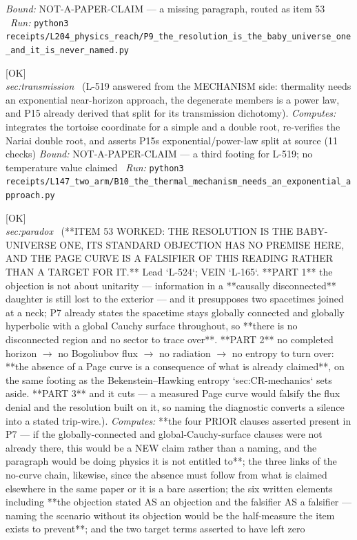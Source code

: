 \begin{description}
 \emph{Bound:} NOT-A-PAPER-CLAIM --- a missing paragraph, routed as item 53
\ \emph{Run:} \texttt{python3 receipts/L204\_physics\_reach/P9\_the\_resolution\_is\_the\_baby\_universe\_one\_and\_it\_is\_never\_named.py}
\item[\label{rcpt:B10_the_thermal_mechanism_needs_an_exponential_approach}\texttt{B10\_the\_thermal\_mechanism\_needs\_an\_exponential\_approach}]\hfill\textsf{[OK]}\\
\textit{sec:transmission} \ (L-519 answered from the MECHANISM side: thermality needs an exponential near-horizon approach, the degenerate members is a power law, and P15 already derived that split for its transmission dichotomy). 
\emph{Computes:} integrates the tortoise coordinate for a simple and a double root, re-verifies the Nariai double root, and asserts P15s exponential/power-law split at source (11 checks)
 \emph{Bound:} NOT-A-PAPER-CLAIM --- a third footing for L-519; no temperature value claimed
\ \emph{Run:} \texttt{python3 receipts/L147\_two\_arm/B10\_the\_thermal\_mechanism\_needs\_an\_exponential\_approach.py}
\item[\label{rcpt:P07_the_page_curve_is_a_falsifier_here_and_the_daughter_is_not_disconnected}\texttt{P07\_the\_page\_curve\_is\_a\_falsifier\_here\_and\_the\_daughter\_is\_not\_disconnected}]\hfill\textsf{[OK]}\\
\textit{sec:paradox} \ (**ITEM 53 WORKED: THE RESOLUTION IS THE BABY-UNIVERSE ONE, ITS STANDARD OBJECTION HAS NO PREMISE HERE, AND THE PAGE CURVE IS A FALSIFIER OF THIS READING RATHER THAN A TARGET FOR IT.** Lead `L-524`; VEIN `L-165`. **PART 1** the objection is not about unitarity --- information in a **causally disconnected** daughter is still lost to the exterior --- and it presupposes two spacetimes joined at a neck; P7 already states the spacetime stays globally connected and globally hyperbolic with a global Cauchy surface throughout, so **there is no disconnected region and no sector to trace over**. **PART 2** no completed horizon \ensuremath{\to} no Bogoliubov flux \ensuremath{\to} no radiation \ensuremath{\to} no entropy to turn over: **the absence of a Page curve is a consequence of what is already claimed**, on the same footing as the Bekenstein--Hawking entropy `sec:CR-mechanics` sets aside. **PART 3** and it cuts --- a measured Page curve would falsify the flux denial and the resolution built on it, so naming the diagnostic converts a silence into a stated trip-wire.). 
\emph{Computes:} **the four PRIOR clauses asserted present in P7 --- if the globally-connected and global-Cauchy-surface clauses were not already there, this would be a NEW claim rather than a naming, and the paragraph would be doing physics it is not entitled to**; the three links of the no-curve chain, likewise, since the absence must follow from what is claimed elsewhere in the same paper or it is a bare assertion; the six written elements including **the objection stated AS an objection and the falsifier AS a falsifier --- naming the scenario without its objection would be the half-measure the item exists to prevent**; and the two target terms asserted to have left zero

\end{description}
